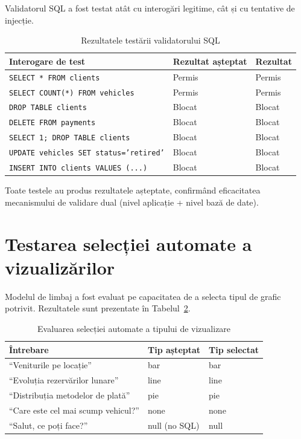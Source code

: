 \documentclass[12pt, a4paper]{report}
\newcommand{\code}[1]{\texttt{#1}}
\begin{document}
Validatorul SQL a fost testat atât cu interogări legitime, cât și cu tentative de injecție.

\begin{table}[H]
\centering
\caption{Rezultatele testării validatorului SQL}
\label{tab:test_validator}
\begin{tabularx}{\textwidth}{X l l}
\toprule
\textbf{Interogare de test} & \textbf{Rezultat așteptat} & \textbf{Rezultat} \\
\midrule
\code{SELECT * FROM clients} & Permis & Permis \\
\code{SELECT COUNT(*) FROM vehicles} & Permis & Permis \\
\code{DROP TABLE clients} & Blocat & Blocat \\
\code{DELETE FROM payments} & Blocat & Blocat \\
\code{SELECT 1; DROP TABLE clients} & Blocat & Blocat \\
\code{UPDATE vehicles SET status='retired'} & Blocat & Blocat \\
\code{INSERT INTO clients VALUES (...)} & Blocat & Blocat \\
\bottomrule
\end{tabularx}
\end{table}

Toate testele au produs rezultatele așteptate, confirmând eficacitatea mecanismului de validare dual (nivel aplicație + nivel bază de date).

\section{Testarea selecției automate a vizualizărilor}

Modelul de limbaj a fost evaluat pe capacitatea de a selecta tipul de grafic potrivit. Rezultatele sunt prezentate în Tabelul~\ref{tab:test_chart}.

\begin{table}[H]
\centering
\caption{Evaluarea selecției automate a tipului de vizualizare}
\label{tab:test_chart}
\begin{tabularx}{\textwidth}{X l l}
\toprule
\textbf{Întrebare} & \textbf{Tip așteptat} & \textbf{Tip selectat} \\
\midrule
``Veniturile pe locație'' & bar & bar \\
``Evoluția rezervărilor lunare'' & line & line \\
``Distribuția metodelor de plată'' & pie & pie \\
``Care este cel mai scump vehicul?'' & none & none \\
``Salut, ce poți face?'' & null (no SQL) & null \\
\bottomrule
\end{tabularx}
\end{table}
\end{document}
